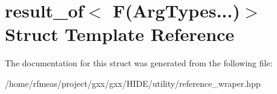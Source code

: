 \hypertarget{structresult__of_3_01F_07ArgTypes_8_8_8_08_4}{}\section{result\+\_\+of$<$ F(Arg\+Types...)$>$ Struct Template Reference}
\label{structresult__of_3_01F_07ArgTypes_8_8_8_08_4}


The documentation for this struct was generated from the following file\+:\begin{DoxyCompactItemize}
\item 
/home/rfmeas/project/gxx/gxx/\+H\+I\+D\+E/utility/reference\+\_\+wraper.\+hpp\end{DoxyCompactItemize}
